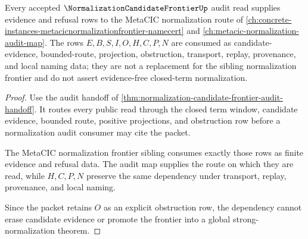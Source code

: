 \begin{theorem}
\label{thm:normalization-candidate-frontier-sibling-dependency}
Every accepted $\NormalizationCandidateFrontierUp$ audit read supplies evidence and refusal rows to the MetaCIC normalization route of \autoref{ch:concrete-instances-metacicnormalizationfrontier-namecert} and \autoref{ch:metacic-normalization-audit-map}. The rows $E,B,S,I,O,H,C,P,N$ are consumed as candidate-evidence, bounded-route, projection, obstruction, transport, replay, provenance, and local naming data; they are not a replacement for the sibling normalization frontier and do not assert evidence-free closed-term normalization.
\end{theorem}
\begin{proof}
Use the audit handoff of \autoref{thm:normalization-candidate-frontier-audit-handoff}. It routes every public read through the closed term window, candidate evidence, bounded route, positive projections, and obstruction row before a normalization audit consumer may cite the packet.

The MetaCIC normalization frontier sibling consumes exactly those rows as finite evidence and refusal data. The audit map supplies the route on which they are read, while $H,C,P,N$ preserve the same dependency under transport, replay, provenance, and local naming.

Since the packet retains $O$ as an explicit obstruction row, the dependency cannot erase candidate evidence or promote the frontier into a global strong-normalization theorem.
\end{proof}

